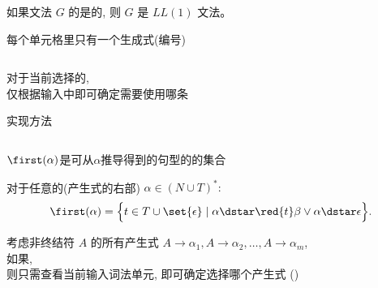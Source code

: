 \begin{frame}{}
  \begin{center}
    \begin{definition}[$LL(1)$文法]
      如果文法 $G$ 的是的,
      则 $G$ 是 $LL(1)$ 文法。
    \end{definition}

     每个单元格里只有一个生成式(编号) \\[8pt]

    \begin{columns}
        
        
    \end{columns}

    \vspace{0.60cm}
    对于当前选择的, \\[4pt]
    仅根据输入中即可确定需要使用哪条
  \end{center}
\end{frame}

\begin{frame}{}
  \begin{center}
    {\large {}实现方法}

    \begin{columns}
        
        
        
    \end{columns}
  \end{center}
\end{frame}

\begin{frame}{}
  \begin{center}

    \vspace{0.60cm}
    $\first(\alpha)$是可从$\alpha$推导得到的句型的的集合
    \begin{definition}
      对于任意的(产生式的右部) $\alpha \in (N \cup T)^{\ast}:$
      \[
        \first(\alpha) = \Big\{t \in T \cup \set{\epsilon}
          \mid \alpha \dstar \red{t}\beta \lor \alpha \dstar \epsilon \Big\}.
      \]
    \end{definition}

    \pause
    \vspace{0.60cm}
    考虑非终结符 $A$ 的所有产生式
    $A \to \alpha_{1}, A \to \alpha_{2}, \dots, A \to \alpha_{m}$, \\[4pt]
    如果, \\[4pt]
    则只需查看当前输入词法单元, 即可确定选择哪个产生式 ()
  \end{center}
\end{frame}

